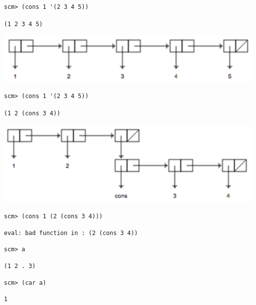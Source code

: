 \documentclass{exam}
\begin{document}
\begin{questions}
\begin{blocksection}
\begin{lstlisting}
scm> (cons 1 '(2 3 4 5))
\end{lstlisting}
\begin{solution}[0.5in]
\texttt{(1 2 3 4 5)}
\begin{center}
\includegraphics[scale=0.3]{9c}
\end{center}
\end{solution}

\begin{lstlisting}
scm> (cons 1 '(2 3 4 5))
\end{lstlisting}
\begin{solution}[0.5in]
\texttt{(1 2 (cons 3 4))}
\begin{center}
\includegraphics[scale=0.3]{9d}
\end{center}
\end{solution}

\begin{lstlisting}
scm> (cons 1 (2 (cons 3 4)))
\end{lstlisting}
\begin{solution}[.25in]
\begin{lstlisting}
eval: bad function in : (2 (cons 3 4))
\end{lstlisting}
\end{solution}

\begin{lstlisting}
scm> a
\end{lstlisting}
\begin{solution}[.25in]
\begin{lstlisting}
(1 2 . 3)
\end{lstlisting}
\end{solution}

\begin{lstlisting}
scm> (car a)
\end{lstlisting}
\begin{solution}[.25in]
\begin{lstlisting}
1
\end{lstlisting}
\end{solution}


\end{blocksection}
\end{questions}
\end{document}
